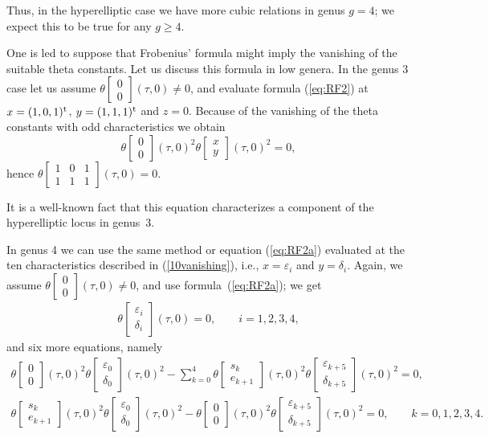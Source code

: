 \documentclass[pdftex]{sigma}
\numberwithin{equation}{section}
\newcommand{\de}{\delta}
\newcommand{\ep}{\varepsilon}
\def\t{\theta}
\def\tt#1#2{{\t\left[\begin{matrix}{#1}\\ {#2}\end{matrix}\right]}}
\begin{document}
Thus, in the hyperelliptic case we have more cubic relations in genus $g=4$; we expect this to be true for any $g\geq 4$.

One is led to suppose that Frobenius' formula might imply the vanishing of the suitable theta constants. Let us discuss this formula in low genera. In the genus 3 case let us assume $\theta\left[\begin{smallmatrix}0 \\ 0 \end{smallmatrix}\right](\tau,0)\neq 0$, and evaluate formula (\ref{eq:RF2}) at $x=(1,0,1)^{\rm t}$,
$y=(1,1,1)^{\rm t}$ and $z=0$. Because of the vanishing of the theta constants with odd characteristics we obtain
\[
\tt{0}{0}(\tau,0)^2\tt{x}{y }(\tau, 0)^2 =0,
\]
hence $\theta\left[\begin{smallmatrix}1&0&1\\ 1&1&1 \end{smallmatrix}\right](\tau, 0)=0$.

It is a well-known fact that this equation characterizes a component of the hyperelliptic locus in genus~3.

In genus 4 we can use the same method or equation (\ref{eq:RF2a}) evaluated at the ten characteristics described in (\ref{10vanishing}), i.e., $x=\ep_i$ and $y=\de_i$. Again, we assume $\theta\left[\begin{smallmatrix}0 \\ 0 \end{smallmatrix}\right](\tau,0)\neq 0$, and use formula~(\ref{eq:RF2a}); we get
\begin{gather}\label{eq:v4}
 \tt{\ep_i}{\de_i}(\tau,0) =0, \qquad i=1,2,3,4,
\end{gather}
and six more equations, namely
\begin{gather*}
\tt{0}{0}(\tau,0)^2\tt{\ep_0}{\de_0 }(\tau, 0)^2 -\sum_{k=0}^4 \tt{s_k}{e_{k+1}}(\tau,0)^2\tt{\ep_{k+5}}{\de_{k+5} }(\tau, 0)^2=0,\\
\tt{s_k}{e_{k+1}}(\tau,0)^2\tt{\ep_0}{\de_0 }(\tau, 0)^2-\tt{0}{0}(\tau,0)^2\tt{\ep_{k+5}}{\de_{k+5} }(\tau, 0)^2=0, \qquad k=0,1,2,3,4.
\end{gather*}
\end{document}
